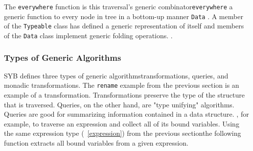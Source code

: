	The \texttt{everywhere} function is this traversal's generic combinator\DIFdelbegin \DIFdel{, }\DIFdelend \DIFaddbegin {}\DIFaddend \texttt{everywhere} \DIFdelbegin {}\DIFdelend \DIFaddbegin {}\DIFaddend a generic function to every node in \DIFdelbegin {}\DIFdelend \DIFaddbegin {}\DIFaddend tree in a bottom-up manner\DIFdelbegin {}\texttt{} %
\texttt{} %
\DIFdelend \DIFaddbegin {}\DIFaddend \texttt{Data} \DIFdelbegin {}\DIFdelend \DIFaddbegin {}\DIFaddend \texttt{\DIFdelbegin {}\DIFdelend \DIFaddbegin {}\DIFaddend }. A member of the \texttt{Typeable} class has defined a generic representation of itself and members of the \texttt{Data} class implement generic folding operations.	\DIFdelbegin {}\DIFdelend \DIFaddbegin {}\texttt{} \texttt{} \texttt{} \texttt{}\DIFaddend .  

\subsubsection{Types of Generic Algorithms}

SYB defines three types of generic algorithms\DIFdelbegin \DIFdel{, }\DIFdelend \DIFaddbegin \DIFadd{: }\DIFaddend transformations, queries, and monadic transformations. The \texttt{rename} example from the previous section is an example of a transformation. Transformations preserve the type of the structure that is traversed. Queries, on the other hand, are "type unifying" algorithms. Queries are good for summarizing information contained in a data structure. \DIFdelbegin {}\DIFdelend \DIFaddbegin {}\DIFaddend , for example, to traverse an expression and collect all of its bound variables. Using the same expression type (\DIFdelbegin {}\DIFdelend \DIFaddbegin {}\DIFaddend ~\ref{expression}) from the previous section\DIFaddbegin \DIFadd{, }\DIFaddend the following function extracts all bound variables from a given expression.

